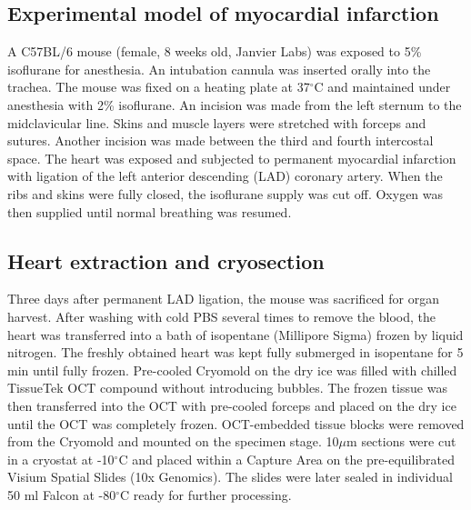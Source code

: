 \documentclass[utf8]{FrontiersinHarvard} %
\begin{document}
\subsection*{Experimental model of myocardial infarction}
A C57BL/6 mouse (female, 8 weeks old, Janvier Labs) was exposed to 5\% isoflurane for anesthesia. An intubation cannula was inserted orally into the trachea. The mouse was fixed on a heating plate at 37$^\circ$C and maintained under anesthesia with 2\% isoflurane. An incision was made from the left sternum to the midclavicular line. Skins and muscle layers were stretched with forceps and sutures. Another incision was made between the third and fourth intercostal space. The heart was exposed and subjected to permanent myocardial infarction with ligation of the left anterior descending (LAD) coronary artery. When the ribs and skins were fully closed, the isoflurane supply was cut off. Oxygen was then supplied until normal breathing was resumed. 

\subsection*{Heart extraction and cryosection}
Three days after permanent LAD ligation, the mouse was sacrificed for organ harvest. After washing with cold PBS several times to remove the blood, the heart was transferred into a bath of isopentane (Millipore Sigma) frozen by liquid nitrogen. The freshly obtained heart was kept fully submerged in isopentane for 5 min until fully frozen. Pre-cooled Cryomold on the dry ice was filled with chilled TissueTek OCT compound without introducing bubbles. The frozen tissue was then transferred into the OCT with pre-cooled forceps and placed on the dry ice until the OCT was completely frozen. OCT-embedded tissue blocks were removed from the Cryomold and mounted on the specimen stage. 10$\mu$m sections were cut in a cryostat at -10$^\circ$C and placed within a Capture Area on the pre-equilibrated Visium Spatial Slides (10x Genomics). The slides were later sealed in individual 50 ml Falcon at -80$^\circ$C ready for further processing. 
\end{document}
